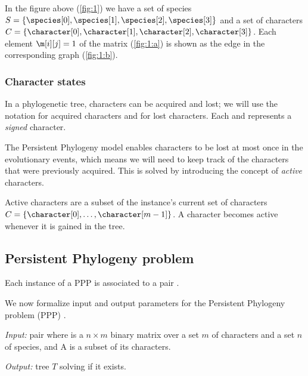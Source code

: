 In the figure above (\ref{fig:1}) we have a set of species $S = \{ \species[0], \species[1], \species[2], \species[3] \}$ and a set of characters $C = \{ \character[0], \character[1], \character[2], \character[3] \}$.
Each element $\m[i][j] = 1$ of the matrix (\ref{fig:1:a}) is shown as the edge \edge{\species[i]}{\character[j]} in the corresponding graph (\ref{fig:1:b}).

\subsubsection{Character states}\label{sssec:charstates}


In a phylogenetic tree, characters can be acquired and lost; we will use the notation \character[][+] for acquired characters and \character[][-] for lost characters. Each \character[][+] and \character[][-] represents a \emph{signed} character.

The Persistent Phylogeny model enables characters to be lost at most once in the evolutionary events,  which means we will need to keep track of the characters that were previously acquired. This is solved by introducing the concept of \emph{active} characters.

Active characters are a subset of the instance's current set of characters $C = \{ \character[0], \dots, \character[m-1] \}$.
A character becomes active whenever it is gained in the tree.

\subsection{Persistent Phylogeny problem}\label{ssec:ppp}


Each instance of a PPP is associated to a pair \ma{}.

We now formalize input and output parameters for the Persistent Phylogeny problem (PPP) \cite{Bonizzoni2016SolvingTP}.

\begin{definition}\label{def:ppp}
  \text{}

  \textit{Input:} pair \ma{} where \m{} is a $n \times m$ binary matrix over a set $m$ of characters and a set $n$ of species, and A is a subset of its characters.

  \textit{Output:} tree $T$ solving \m{} if it exists.
\end{definition}

